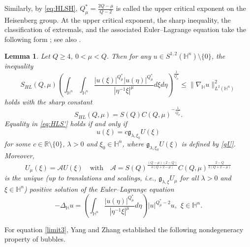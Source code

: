 \documentclass[11pt]{article}
\newtheorem{lemma}{Lemma}[section]
\begin{document}
Similarly, by \eqref{eq:HLSH}, $Q^{\ast}_{\mu}=\frac{2Q-\mu}{Q-2}$ is called the upper critical exponent on the Heisenberg group.
{At the upper critical exponent, the sharp inequality, the classification of extremals, and the associated Euler--Lagrange equation take the following form \cite{YZ251}; see also \cite{ZWZLX25}.}
\begin{lemma}
 Let $Q\geq 4$, $0<\mu<Q$. Then for any $u\in S^{1,2}(\mathbb{H}^{n})\setminus\{0\}$, the inequality
 \begin{equation}\label{eq:HLS'}
 S_{HL}(Q,\mu) \left(\int_{\mathbb{H}^{n}}\int_{\mathbb{H}^{n}}\frac{|u(\xi)|^{Q^{\ast}_{\mu}}|u(\eta)|
^{Q^{\ast}_{\mu}}}{|\eta^{-1}\xi|^{\mu}}{d}\xi{d}\eta\right)^{\frac{1}{Q^{\ast}_{\mu}}}\leq \|\nabla_{\mathbb{H}}u\|^2_{L^2(\mathbb{H}^{n})}
 \end{equation}
holds with the sharp constant
\begin{equation}\label{relation}
 S_{HL}(Q,\mu)=S(Q)C(Q,\mu)^{-\frac{1}{Q^{\ast}_{\mu}}}.
\end{equation}
Equality in \eqref{eq:HLS'} holds
if and only if \[u(\xi)=c\mathfrak{g}_{\lambda,\xi_0}U(\xi)\] for some $c\in\mathbb{R}\setminus\{0\}$, $\lambda>0$ and $\xi_0\in \mathbb{H}^n$, where $\mathfrak{g}_{\lambda,\xi_0}U(\xi)$ is defined by \eqref{gU}. Moreover,
 \begin{equation*}
 U_\mu(\xi)=\mathcal{A}U(\xi)\quad \mathrm{with}\quad \mathcal{A}=S(Q)^{\frac{(Q-\mu)(2-Q)}{4(Q+2-\mu)}}C(Q,\mu)^{\frac{2-Q}{2(Q+2-\mu)}}
\end{equation*}
is the unique (up to translations and scalings, i.e., $\mathfrak{g}_{\lambda,\xi}U_\mu$ for all $\lambda>0$ and $\xi\in\mathbb{H}^{n}$)
 positive solution of the Euler--Lagrange equation
\begin{equation}\label{limit3}
 -\Delta_{\mathbb{H}} u=\left(\int_{\mathbb{H}^{n}}\frac{|u(\eta)|
^{Q^{\ast}_{\mu}}}{|\eta^{-1}\xi|^{\mu}}{d}\eta\right)|u|^{Q^{\ast}_{\mu}-2}u,~~\xi\in\mathbb{H}^{n}.
\end{equation}
\end{lemma}
For equation \eqref{limit3}, Yang and Zhang \cite{YZ251} established
the following nondegeneracy property of bubbles.
\end{document}
